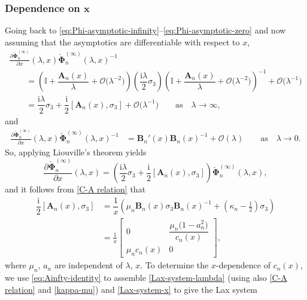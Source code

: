 \documentclass[11pt]{article}
\numberwithin{equation}{section}
\numberwithin{equation}{section}
\newcommand{\ii}{\mathrm{i}}
\newcommand{\para}[1]{\breve{#1}}
\begin{document}
\subsubsection[Dependence on x]{Dependence on $\boldsymbol{x}$}
Going back to \eqref{eq:Phi-asymptotic-infinity}--\eqref{eq:Phi-asymptotic-zero} and now assuming that the asymptotics are differentiable with respect to $x$,
\begin{gather*}
 \frac{\partial\para{\boldsymbol \Phi}^{(\infty)}_n}{\partial x}(\lambda,x) \para{\boldsymbol \Phi}_n^{(\infty)} (\lambda,x)^{-1}\\
 \qquad= \left(\mathbb I + \dfrac{\mathbf{A}_{n}(x)}{\lambda} + \mathcal{O}\big( \lambda^{-2}\big) \right) \left( \dfrac{\ii \lambda}{2}\sigma_3 \right)\left(\mathbb I + \dfrac{\mathbf{A}_{n}(x)}{\lambda} + \mathcal{O}\big( \lambda^{-2}\big)\right)^{-1} + \mathcal{O}\big( \lambda^{-1} \big)\\
 \qquad = \dfrac{\ii \lambda}{2} \sigma_3 + \dfrac{\ii}{2} [\mathbf{A}_{n}(x), \sigma_3] + \mathcal{O}\big( \lambda^{-1} \big) \qquad \text{as} \quad \lambda \to \infty,
\end{gather*}
and
\begin{align*}
 \frac{\partial\para{\boldsymbol \Phi}^{(\infty)}_n}{\partial x}(\lambda,x) \para{\boldsymbol \Phi}_n^{(\infty)}(\lambda,x)^{-1} &= \mathbf{B}_n'(x) \mathbf{B}_n(x)^{-1} + \mathcal{O}(\lambda) \qquad \text{as} \quad \lambda \to 0.
\end{align*}
So, applying Liouville's theorem yields
\begin{equation}
 \frac{\partial\para{\boldsymbol \Phi}^{(\infty)}_{n}}{\partial x} (\lambda,x) = \left( \dfrac{\ii \lambda}{2} \sigma_3 + \dfrac{\ii}{2} [\mathbf{A}_n(x), \sigma_3] \right) \para{\boldsymbol \Phi}_n^{(\infty)}(\lambda,x),
 \label{Lax-system-x}
\end{equation}
and it follows from \eqref{C-A relation} that
\begin{align}
\dfrac{\ii}{2}[\mathbf{A}_n(x), \sigma_3] &= \dfrac{1}{x} \left( \mu_n\mathbf{B}_n(x) \sigma_3 \mathbf{B}_n(x)^{-1} +\left(\kappa_n-\frac{1}{2}\right) \sigma_3 \right)\nonumber\\
& = \frac{1}{x}\begin{bmatrix} 0 & \dfrac{\mu_n\big(1 - a_n^2\big)}{c_n(x)} \\ \mu_n c_n(x) & 0 \end{bmatrix},
\label{eq:Ainfty-identity}
\end{align}
where $\mu_n$, $a_n$ are independent of $\lambda$, $x$. To determine the $x$-dependence of $c_n(x)$, we use \eqref{eq:Ainfty-identity} to assemble \eqref{Lax-system-lambda} (using also \eqref{C-A relation} and \eqref{kappa-mu}) and \eqref{Lax-system-x} to give the Lax system
\end{document}
